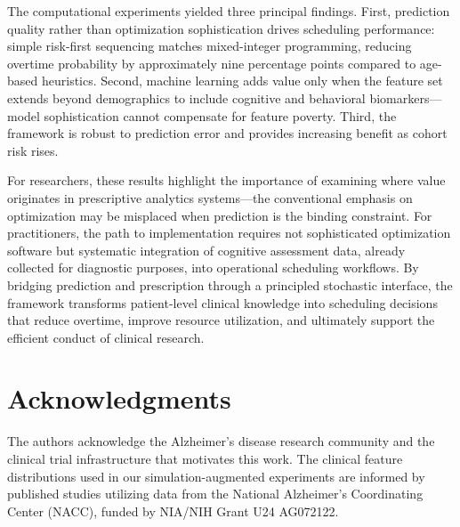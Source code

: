 \documentclass[msom,blindrev]{informs3}
\begin{document}
The computational experiments yielded three principal findings. First, prediction quality rather than optimization sophistication drives scheduling performance: simple risk-first sequencing matches mixed-integer programming, reducing overtime probability by approximately nine percentage points compared to age-based heuristics. Second, machine learning adds value only when the feature set extends beyond demographics to include cognitive and behavioral biomarkers---model sophistication cannot compensate for feature poverty. Third, the framework is robust to prediction error and provides increasing benefit as cohort risk rises.

For researchers, these results highlight the importance of examining where value originates in prescriptive analytics systems---the conventional emphasis on optimization may be misplaced when prediction is the binding constraint. For practitioners, the path to implementation requires not sophisticated optimization software but systematic integration of cognitive assessment data, already collected for diagnostic purposes, into operational scheduling workflows. By bridging prediction and prescription through a principled stochastic interface, the framework transforms patient-level clinical knowledge into scheduling decisions that reduce overtime, improve resource utilization, and ultimately support the efficient conduct of clinical research.



\section*{Acknowledgments}

The authors acknowledge the Alzheimer's disease research community and the clinical trial infrastructure that motivates this work. The clinical feature distributions used in our simulation-augmented experiments are informed by published studies utilizing data from the National Alzheimer's Coordinating Center (NACC), funded by NIA/NIH Grant U24 AG072122.



\end{document}
